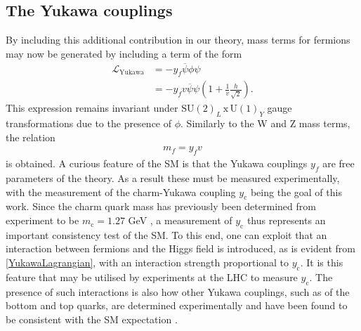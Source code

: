 \subsection{The Yukawa couplings}
By including this additional contribution in our theory, mass terms for fermions may now be generated by including a term of the form
\begin{align}
    \mathcal{L}_{\mathrm{Yukawa}} &= -y_{f}\overline{\psi}\phi\psi \\
    &= -y_{f}v\overline{\psi}\psi(1 + \frac{1}{v}\frac{h}{\sqrt{2}}). \label{YukawaLagrangian}
\end{align}
This expression remains invariant under $\mathrm{SU}(2)_L \, \mathrm{x} \, \mathrm{U}(1)_{Y}$ gauge transformations due to the presence of $\phi$. Similarly to the W and Z mass terms, the relation
\begin{align}
    m_{f} = y_{f} v
\end{align} 
is obtained. A curious feature of the SM is that the Yukawa couplings $y_{f}$ are free parameters of the theory. As a result these must be measured experimentally, with the measurement of the charm-Yukawa coupling $y_{\mathrm{c}}$ being the goal of this work. Since the charm quark mass has previously been determined from experiment to be $m_{\mathrm{c}} = 1.27$ GeV \cite{PhysRevD.110.030001}, a measurement of $y_{\mathrm{c}}$ thus represents an important consistency test of the SM. To this end, one can exploit that an interaction between fermions and the Higgs field is introduced, as is evident from \autoref{YukawaLagrangian}, with an interaction strength proportional to $y_{\mathrm{c}}$. It is this feature that may be utilised by experiments at the LHC to measure $y_{\mathrm{c}}$. The presence of such interactions is also how other Yukawa couplings, such as of the bottom and top quarks, are determined experimentally and have been found to be consistent with the SM expectation \cite{bottomYukawa}\cite{topYukawa}. 
